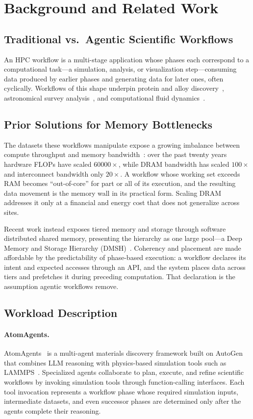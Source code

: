 \section{Background and Related Work}

\subsection{Traditional vs.\ Agentic Scientific Workflows}

An HPC workflow is a multi-stage application whose phases each correspond to a
computational task---a simulation, analysis, or visualization step---consuming
data produced by earlier phases and generating data for later ones, often
cyclically. Workflows of this shape underpin protein and alloy
discovery~\cite{atomagents,amaro_covid_data}, astronomical survey
analysis~\cite{hpc_astro_ex}, and computational fluid
dynamics~\cite{hpc_fluiddynamics_ex}.

\subsection{Prior Solutions for Memory Bottlenecks}

The datasets these workflows manipulate expose a growing imbalance between
compute throughput and memory bandwidth~\cite{ai_memwall}: over the past twenty
years hardware
FLOPs have scaled $60000\times$, while DRAM bandwidth has scaled $100\times$
and interconnect bandwidth only $20\times$. A workflow whose working set
exceeds RAM becomes ``out-of-core'' for part or all of its execution, and the
resulting data movement is the memory wall in its practical form. Scaling DRAM
addresses it only at a financial and energy cost that does not generalize
across sites.

Recent work instead exposes tiered memory and storage through software
distributed shared memory, presenting the hierarchy as one large pool---a Deep
Memory and Storage Hierarchy (DMSH)~\cite{hermes,megammap,hades}. Coherency and placement are made
affordable by the predictability of phase-based execution: a workflow declares
its intent and expected accesses through an API, and the system places data
across tiers and prefetches it during preceding computation. That declaration
is the assumption agentic workflows remove.

\subsection{Workload Description}

\paragraph{AtomAgents.}
AtomAgents~\cite{atomagents} is a multi-agent materials discovery framework
built on AutoGen~\cite{autogen} that combines LLM reasoning with physics-based
simulation tools such as LAMMPS~\cite{lammps}. Specialized agents collaborate to plan, execute, and refine scientific
workflows by invoking simulation tools through function-calling interfaces.
Each tool invocation represents a workflow phase whose required simulation
inputs, intermediate datasets, and even successor phases are determined only
after the agents complete their reasoning.
